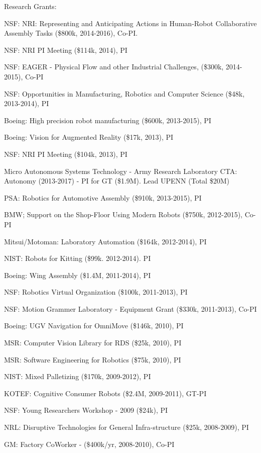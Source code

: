 \documentclass{article}
\begin{document}
\begin{cv}
\begin{cvlist}{Research Grants:}
\item NSF: NRI: Representing and Anticipating Actions in Human-Robot
  Collaborative Assembly Tasks (\$800k, 2014-2016), Co-PI.
\item NSF: NRI PI Meeting (\$114k, 2014), PI
\item NSF: EAGER - Physical Flow and other Industrial Challenges,
  (\$300k, 2014-2015), Co-PI
\item NSF: Opportunities in Manufacturing, Robotics and Computer Science
  (\$48k, 2013-2014), PI
\item Boeing: High precision robot manufacturing (\$600k, 2013-2015), PI
\item Boeing: Vision for Augmented Reality (\$17k, 2013), PI
\item NSF: NRI PI Meeting (\$104k, 2013), PI
\item Micro Autonomous Systems Technology - Army Research Laboratory
  CTA: Autonomy (2013-2017) - PI for GT (\$1.9M). Lead UPENN (Total
  \$20M) %
\item PSA: Robotics for Automotive Assembly (\$910k, 2013-2015), PI
\item BMW; Support on the Shop-Floor Using Modern Robots (\$750k,
  2012-2015), Co-PI
\item Mitsui/Motoman: Laboratory Automation (\$164k, 2012-2014), PI
\item NIST: Robots for Kitting (\$99k. 2012-2014). PI
\item Boeing: Wing Assembly (\$1.4M, 2011-2014), PI
\item NSF: Robotics Virtual Organization (\$100k, 2011-2013), PI
\item NSF: Motion Grammer Laboratory - Equipment Grant (\$330k, 2011-2013), Co-PI
\item Boeing: UGV Navigation for OmniMove (\$146k, 2010), PI
\item MSR: Computer Vision Library for RDS (\$25k, 2010), PI
\item MSR: Software Engineering for Robotics (\$75k, 2010), PI
\item NIST: Mixed Palletizing (\$170k, 2009-2012), PI
\item KOTEF: Cognitive Consumer Robots (\$2.4M, 2009-2011), GT-PI
\item NSF: Young Researchers Workshop - 2009 (\$24k), PI
\item NRL: Disruptive Technologies for General Infra-structure  (\$25k, 2008-2009), PI
\item GM: Factory CoWorker - (\$400k/yr, 2008-2010), Co-PI

\end{cvlist}
\end{cv}
\end{document}
